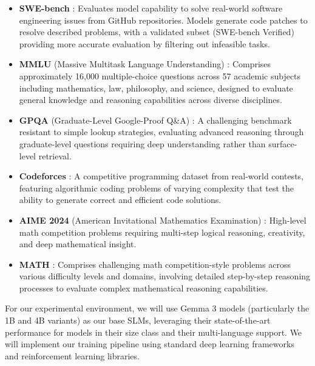 \documentclass[11pt, oneside]{article}   	%
\begin{document}
\begin{itemize}
	\item \textbf{SWE-bench} \cite{jimenez2024swebenchlanguagemodelsresolve}: Evaluates model capability to solve real-world software engineering issues from GitHub repositories. Models generate code patches to resolve described problems, with a validated subset (SWE-bench Verified) providing more accurate evaluation by filtering out infeasible tasks.

	\item \textbf{MMLU} (Massive Multitask Language Understanding) \cite{hendrycks2021measuringmassivemultitasklanguage}: Comprises approximately 16,000 multiple-choice questions across 57 academic subjects including mathematics, law, philosophy, and science, designed to evaluate general knowledge and reasoning capabilities across diverse disciplines.

	\item \textbf{GPQA} (Graduate-Level Google-Proof Q\&A) \cite{rein2023gpqagraduatelevelgoogleproofqa}: A challenging benchmark resistant to simple lookup strategies, evaluating advanced reasoning through graduate-level questions requiring deep understanding rather than surface-level retrieval.

	\item \textbf{Codeforces} \cite{quan2025codeelobenchmarkingcompetitionlevelcode}: A competitive programming dataset from real-world contests, featuring algorithmic coding problems of varying complexity that test the ability to generate correct and efficient code solutions.

	\item \textbf{AIME 2024} (American Invitational Mathematics Examination) \cite{maa2024aime}: High-level math competition problems requiring multi-step logical reasoning, creativity, and deep mathematical insight.

	\item \textbf{MATH} \cite{hendrycks2021measuringmathematicalproblemsolving}: Comprises challenging math competition-style problems across various difficulty levels and domains, involving detailed step-by-step reasoning processes to evaluate complex mathematical reasoning capabilities.
\end{itemize}

For our experimental environment, we will use Gemma 3 models (particularly the 1B and 4B variants) as our base SLMs, leveraging their state-of-the-art performance for models in their size class and their multi-language support. We will implement our training pipeline using standard deep learning frameworks and reinforcement learning libraries.
\end{document}
